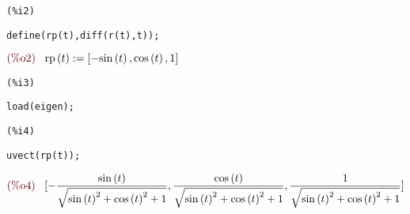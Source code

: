 \documentclass[12pt]{article}
\begin{document}
\noindent
\begin{minipage}[t]{8ex}{\color{red}\bf
\begin{verbatim}
(%i2) 
\end{verbatim}}
\end{minipage}
\begin{minipage}[t]{\textwidth}{\color{blue}
\begin{verbatim}
define(rp(t),diff(r(t),t));
\end{verbatim}}
\end{minipage}
\begin{math}\displaystyle
\parbox{8ex}{\color{labelcolor}(\%o2) }
\mathrm{rp}\left( t\right) :=[-\mathrm{sin}\left( t\right) ,\mathrm{cos}\left( t\right) ,1]
\end{math}


\noindent
\begin{minipage}[t]{8ex}{\color{red}\bf
\begin{verbatim}
(%i3) 
\end{verbatim}}
\end{minipage}
\begin{minipage}[t]{\textwidth}{\color{blue}
\begin{verbatim}
load(eigen);
\end{verbatim}}
\end{minipage}

\noindent
\begin{minipage}[t]{8ex}{\color{red}\bf
\begin{verbatim}
(%i4) 
\end{verbatim}}
\end{minipage}
\begin{minipage}[t]{\textwidth}{\color{blue}
\begin{verbatim}
uvect(rp(t));
\end{verbatim}}
\end{minipage}
\begin{math}\displaystyle
\parbox{8ex}{\color{labelcolor}(\%o4) }
[-\frac{\mathrm{sin}\left( t\right) }{\sqrt{{\mathrm{sin}\left( t\right) }^{2}+{\mathrm{cos}\left( t\right) }^{2}+1}},\frac{\mathrm{cos}\left( t\right) }{\sqrt{{\mathrm{sin}\left( t\right) }^{2}+{\mathrm{cos}\left( t\right) }^{2}+1}},\frac{1}{\sqrt{{\mathrm{sin}\left( t\right) }^{2}+{\mathrm{cos}\left( t\right) }^{2}+1}}]
\end{math}
\end{document}
